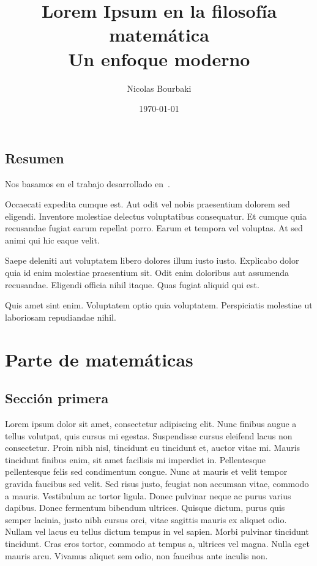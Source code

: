 \documentclass[oneside,openright,titlepage,numbers=noenddot,openany,headinclude,footinclude=true,
cleardoublepage=empty,abstractoff,BCOR=5mm,paper=a4,fontsize=12pt,ngerman,american,spanish]{scrreprt}
\author{Nicolas Bourbaki}
\date{\today}
\title{Lorem Ipsum en la filosofía matemática\\\medskip
\large Un enfoque moderno}
\begin{document}
\maketitle
\tableofcontents


\chapter*{Resumen}

Nos basamos en el trabajo desarrollado en~\cite{turing1936a}.

Occaecati expedita cumque est. Aut odit vel nobis praesentium dolorem
sed eligendi. Inventore molestiae delectus voluptatibus
consequatur. Et cumque quia recusandae fugiat earum repellat
porro. Earum et tempora vel voluptas. At sed animi qui hic eaque
velit.

Saepe deleniti aut voluptatem libero dolores illum iusto
iusto. Explicabo dolor quia id enim molestiae praesentium sit. Odit
enim doloribus aut assumenda recusandae. Eligendi officia nihil
itaque. Quas fugiat aliquid qui est.

Quis amet sint enim. Voluptatem optio quia voluptatem. Perspiciatis
molestiae ut laboriosam repudiandae nihil.


\part{Parte de matemáticas}

\chapter{Sección primera}

Lorem ipsum dolor sit amet, consectetur adipiscing elit. Nunc finibus
augue a tellus volutpat, quis cursus mi egestas. Suspendisse cursus
eleifend lacus non consectetur. Proin nibh nisl, tincidunt eu
tincidunt et, auctor vitae mi. Mauris tincidunt finibus enim, sit amet
facilisis mi imperdiet in. Pellentesque pellentesque felis sed
condimentum congue. Nunc at mauris et velit tempor gravida faucibus
sed velit. Sed risus justo, feugiat non accumsan vitae, commodo a
mauris. Vestibulum ac tortor ligula. Donec pulvinar neque ac purus
varius dapibus. Donec fermentum bibendum ultrices. Quisque dictum,
purus quis semper lacinia, justo nibh cursus orci, vitae sagittis
mauris ex aliquet odio. Nullam vel lacus eu tellus dictum tempus in
vel sapien. Morbi pulvinar tincidunt tincidunt. Cras eros tortor,
commodo at tempus a, ultrices vel magna. Nulla eget mauris
arcu. Vivamus aliquet sem odio, non faucibus ante iaculis non.
\end{document}
